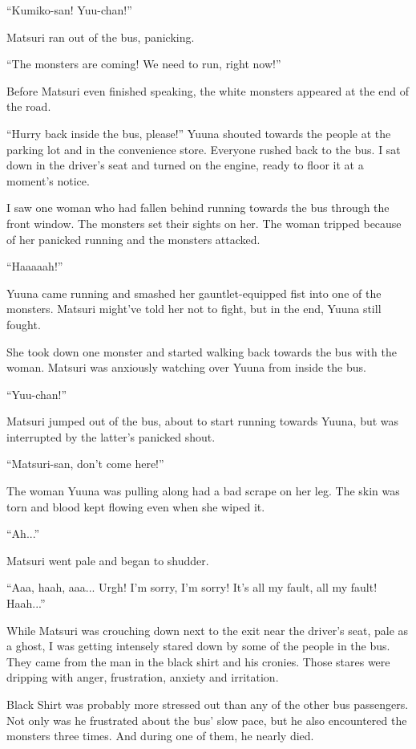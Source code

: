 ``Kumiko-san! Yuu-chan!''

Matsuri ran out of the bus, panicking.

``The monsters are coming! We need to run, right now!''

Before Matsuri even finished speaking, the white monsters appeared at the end of the road.

``Hurry back inside the bus, please!'' Yuuna shouted towards the people at the parking lot and in the convenience store. Everyone rushed back to the bus. I sat down in the driver's seat and turned on the engine, ready to floor it at a moment's notice.

I saw one woman who had fallen behind running towards the bus through the front window. The monsters set their sights on her. The woman tripped because of her panicked running and the monsters attacked.

``Haaaaah!''

Yuuna came running and smashed her gauntlet-equipped fist into one of the monsters. Matsuri might've told her not to fight, but in the end, Yuuna still fought.

She took down one monster and started walking back towards the bus with the woman. Matsuri was anxiously watching over Yuuna from inside the bus.

``Yuu-chan!''

Matsuri jumped out of the bus, about to start running towards Yuuna, but was interrupted by the latter's panicked shout.

``Matsuri-san, don't come here!''

The woman Yuuna was pulling along had a bad scrape on her leg. The skin was torn and blood kept flowing even when she wiped it.

``Ah...''

Matsuri went pale and began to shudder.

``Aaa, haah, aaa... Urgh! I'm sorry, I'm sorry! It's all my fault, all my fault! Haah...''

While Matsuri was crouching down next to the exit near the driver's seat, pale as a ghost, I was getting intensely stared down by some of the people in the bus. They came from the man in the black shirt and his cronies. Those stares were dripping with anger, frustration, anxiety and irritation.

Black Shirt was probably more stressed out than any of the other bus passengers. Not only was he frustrated about the bus' slow pace, but he also encountered the monsters three times. And during one of them, he nearly died.

